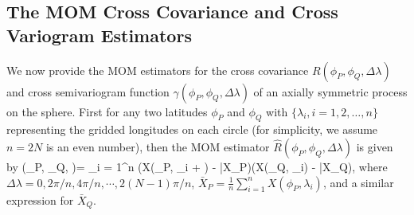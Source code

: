\subsection{The MOM Cross Covariance and Cross Variogram Estimators}

We now provide the MOM estimators for the cross covariance $R(\phi_P, \phi_Q, \Delta \lambda)$ and cross semivariogram function $\gamma(\phi_P, \phi_Q, \Delta \lambda)$ of an axially symmetric process on the sphere. First for any two latitudes $\phi_P$ and $\phi_Q$ with $\{\lambda_i, i = 1, 2, \ldots, n\}$ representing the gridded longitudes on each circle (for simplicity, we assume $n = 2N$ is an even number), then the MOM estimator $\hat{R}(\phi_P, \phi_Q, \Delta \lambda)$ is given by
\beq \label{cross_covariance}
(\phi_P, \phi_Q, \Delta \lambda)= \sum_{i = 1}^n (X(\phi_P, \lambda_i + \Delta \lambda) - \bar{X}_P)(X(\phi_Q, \lambda_i) - \bar{X}_Q),
\eeq
where $\Delta \lambda = 0, 2\pi/n, 4\pi/n, \cdots, 2(N-1)\pi/n$, $\bar{X}_P = \frac{1}{n}\sum_{i=1}^n X(\phi_P, \lambda_i)$, and a similar expression for $\bar{X}_Q$. 

